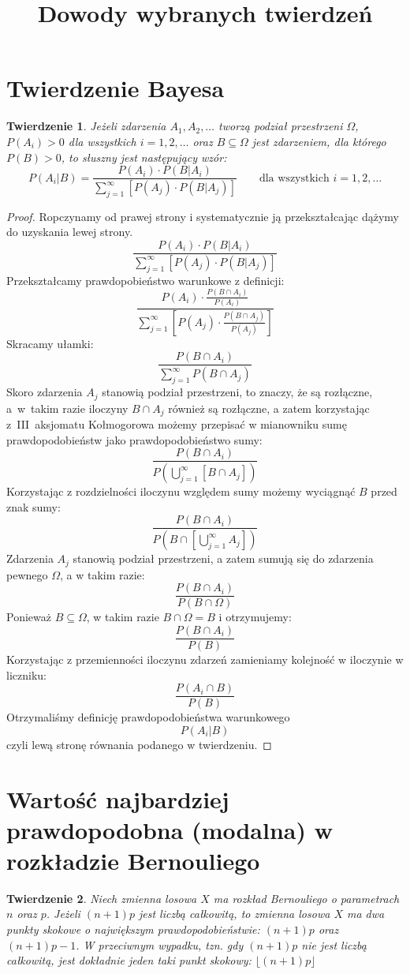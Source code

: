 \documentclass{mwart}
\title{Dowody wybranych twierdzeń}
\newtheorem*{theorem}{Twierdzenie}
\begin{document}
\section*{Twierdzenie Bayesa}
\begin{theorem}
Jeżeli zdarzenia $A_1, A_2, \ldots$ tworzą podział przestrzeni $\Omega$, $P(A_i)>0$ dla wszystkich $i=1,2,\ldots$ oraz $B\subseteq\Omega$ jest zdarzeniem, dla którego $P(B)>0$, to słuszny jest następujący wzór:
\[ P(A_i|B) = \frac{P(A_i)\cdot P(B|A_i)}{\sum_{j=1}^\infty \left[ P(A_j)\cdot P(B|A_j)\right]} \qquad \text{dla wszystkich } i=1,2,\ldots \]
\end{theorem}

\begin{proof}
Ropczynamy od prawej strony i systematycznie ją przekształcając dążymy do uzyskania lewej strony.
\[ \frac{P(A_i)\cdot P(B|A_i)}{\sum_{j=1}^\infty \left[ P(A_j)\cdot P(B|A_j)\right]} \]
Przekształcamy prawdopobieństwo warunkowe z definicji: 
\[ \frac{P(A_i)\cdot \frac{P(B\cap A_i)}{P(A_i)}}{\sum_{j=1}^\infty \left[ P(A_j)\cdot \frac{P(B\cap A_j)}{P(A_j)}\right]}
\]
Skracamy ułamki:
\[
 \frac{P(B\cap A_i)}{\sum_{j=1}^\infty P(B\cap A_j)}
\]
Skoro zdarzenia $A_j$ stanowią podział przestrzeni, to znaczy, że są rozłączne, a~w~takim razie iloczyny $B\cap A_j$ również są rozłączne, a zatem korzystając z~III~aksjomatu Kołmogorowa możemy przepisać w mianowniku sumę prawdopodobieństw jako prawdopodobieństwo sumy:
\[
 \frac{P(B\cap A_i)}{P\left(\bigcup_{j=1}^\infty [B\cap A_j]\right)}
\]
Korzystając z rozdzielności iloczynu względem sumy możemy wyciągnąć $B$ przed znak sumy:
\[
 \frac{P(B\cap A_i)}{P\left(B \cap \left[\bigcup_{j=1}^\infty A_j\right]\right)}
\]
Zdarzenia $A_j$ stanowią podział przestrzeni, a zatem sumują się do zdarzenia pewnego $\Omega$, a w takim razie:
\[
 \frac{P(B\cap A_i)}{P\left(B \cap \Omega\right)}
\]
Ponieważ $B\subseteq\Omega$, w takim razie $B\cap\Omega=B$ i otrzymujemy:
\[
 \frac{P(B\cap A_i)}{P\left(B\right)}
\]
Korzystając z przemienności iloczynu zdarzeń zamieniamy kolejność w iloczynie w liczniku:
\[
 \frac{P(A_i\cap B)}{P\left(B\right)}
\]
Otrzymaliśmy definicję prawdopodobieństwa warunkowego
\[ P(A_i|B) \]
czyli lewą stronę równania podanego w twierdzeniu.
\end{proof}

\clearpage
\section*{Wartość najbardziej prawdopodobna (modalna) w rozkładzie Bernouliego}
\begin{theorem}
Niech zmienna losowa $X$ ma rozkład Bernouliego o parametrach $n$ oraz $p$.
Jeżeli $(n+1)p$ jest liczbą całkowitą, to zmienna losowa $X$ ma dwa punkty skokowe o największym prawdopodobieństwie: $(n+1)p$ oraz $(n+1)p-1$.
W przeciwnym wypadku, tzn. gdy $(n+1)p$ nie jest liczbą całkowitą, jest dokładnie jeden taki punkt skokowy: $\lfloor (n+1)p\rfloor$
\end{theorem}
\end{document}
